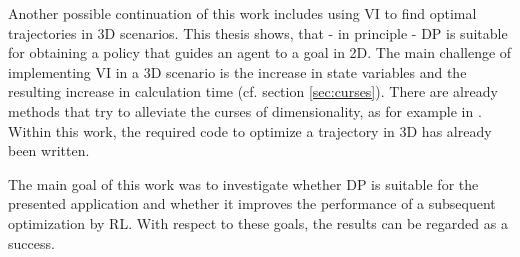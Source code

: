 Another possible continuation of this work includes using VI to find optimal trajectories in 3D scenarios. This thesis shows, that - in principle - DP is suitable for obtaining a policy that guides an agent to a goal in 2D. The main challenge of implementing VI in a 3D scenario is the increase in state variables and the resulting increase in calculation time (cf. section \ref{sec:curses}). There are already methods that try to alleviate the curses of dimensionality, as for example in \cite{Powell2007ADP}. Within this work, the required code to optimize a trajectory in 3D has already been written.

The main goal of this work was to investigate whether DP is suitable for the presented application and whether it improves the performance of a subsequent optimization by RL. With respect to these goals, the results can be regarded as a success.

